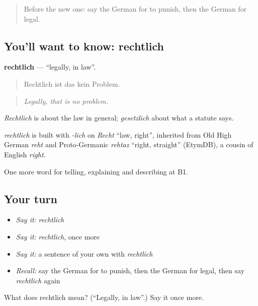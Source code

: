 \begin{quote}
Before the new one: say the German for to punish, then the German for legal.
\end{quote}

\subsection*{You'll want to know: rechtlich}
\textbf{rechtlich} — \textquotedblleft{}legally, in law\textquotedblright{}.

\begin{quote}
Rechtlich ist das kein Problem.
\end{quote}

\begin{quote}
\emph{Legally, that is no problem.}
\end{quote}

\emph{Rechtlich} is about the law in general; \emph{gesetzlich} about what a statute says.

\begin{cousinweb}
\emph{rechtlich} is built with \emph{-lich} on \emph{Recht} \textquotedblleft{}law, right\textquotedblright{}, inherited from Old High German \emph{reht} and Proto-Germanic \emph{rehtaz} \textquotedblleft{}right, straight\textquotedblright{} (EtymDB), a cousin of English \emph{right}.
\end{cousinweb}

\begin{grammarlens}[title={What you've built}]
One more word for telling, explaining and describing at B1.
\end{grammarlens}

\subsection*{Your turn}
\begin{itemize}
\raggedright
  \item \emph{Say it:} \emph{rechtlich}
  \item \emph{Say it:} \emph{rechtlich}, once more
  \item \emph{Say it:} a sentence of your own with \emph{rechtlich}
  \item \emph{Recall:} say the German for to punish, then the German for legal, then say \emph{rechtlich} again
\end{itemize}

\begin{tcolorbox}[breakable,colback=teal!4,colframe=teal!35!black,title={Before you move on}]
What does rechtlich mean? (\textquotedblleft{}Legally, in law\textquotedblright{}.) Say it once more.
\end{tcolorbox}
